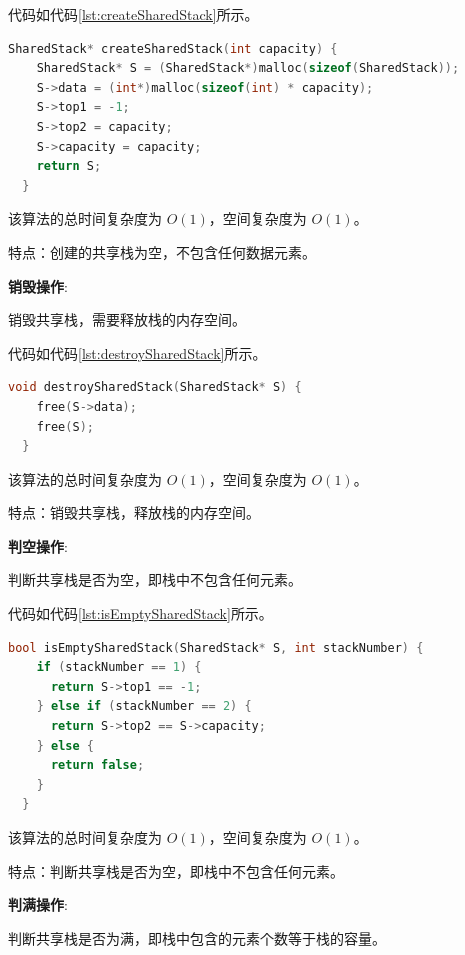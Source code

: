 \documentclass[lang=cn,newtx,10pt,scheme=chinese]{../elegantbook}
\begin{document}
代码如代码\ref{lst:createSharedStack}所示。

\begin{lstlisting}[language=C++, caption={创建一个空共享栈示例代码}, label={lst:createSharedStack}]
  SharedStack* createSharedStack(int capacity) {
    SharedStack* S = (SharedStack*)malloc(sizeof(SharedStack));
    S->data = (int*)malloc(sizeof(int) * capacity);
    S->top1 = -1;
    S->top2 = capacity;
    S->capacity = capacity;
    return S;
  }

\end{lstlisting}

该算法的总时间复杂度为 $O(1)$，空间复杂度为 $O(1)$。

特点：创建的共享栈为空，不包含任何数据元素。

\textbf{销毁操作}:

销毁共享栈，需要释放栈的内存空间。

代码如代码\ref{lst:destroySharedStack}所示。

\begin{lstlisting}[language=C++, caption={销毁共享栈示例代码}, label={lst:destroySharedStack}]
  void destroySharedStack(SharedStack* S) {
    free(S->data);
    free(S);
  }

\end{lstlisting}

该算法的总时间复杂度为 $O(1)$，空间复杂度为 $O(1)$。

特点：销毁共享栈，释放栈的内存空间。

\textbf{判空操作}:

判断共享栈是否为空，即栈中不包含任何元素。

代码如代码\ref{lst:isEmptySharedStack}所示。

\begin{lstlisting}[language=C++, caption={判断共享栈是否为空示例代码}, label={lst:isEmptySharedStack}]
  bool isEmptySharedStack(SharedStack* S, int stackNumber) {
    if (stackNumber == 1) {
      return S->top1 == -1;
    } else if (stackNumber == 2) {
      return S->top2 == S->capacity;
    } else {
      return false;
    }
  }

\end{lstlisting}

该算法的总时间复杂度为 $O(1)$，空间复杂度为 $O(1)$。

特点：判断共享栈是否为空，即栈中不包含任何元素。

\textbf{判满操作}:

判断共享栈是否为满，即栈中包含的元素个数等于栈的容量。
\end{document}
